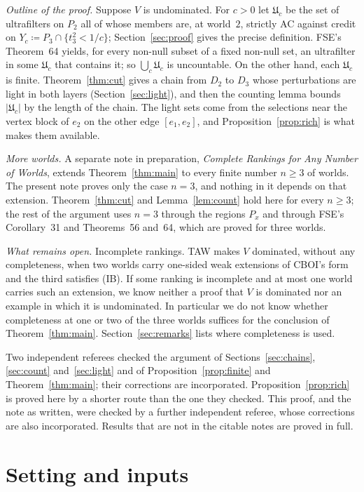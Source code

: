 \documentclass[11pt]{article}
\theoremstyle{definition}\newtheorem{definition}[theorem]{Definition}
\theoremstyle{remark}\newtheorem{remark}[theorem]{Remark}
\newcommand{\UU}{\mathfrak U}
\begin{document}
\emph{Outline of the proof.} Suppose $V$ is undominated. For $c>0$ let
$\UU_c$ be the set of ultrafilters on $P_2$ all of whose members are, at
world~$2$, strictly AC against credit on $Y_c\coloneqq P_3\cap
\{t^2_3<1/c\}$; Section~\ref{sec:proof} gives the precise definition.
FSE's Theorem~64 yields, for every non-null subset of a fixed non-null set,
an ultrafilter in some $\UU_c$ that contains it; so $\bigcup_c\UU_c$ is
uncountable. On the other hand, each $\UU_c$ is finite.
Theorem~\ref{thm:cut} gives a chain from $D_2$ to $D_3$ whose perturbations
are light in both layers (Section~\ref{sec:light}), and then the counting
lemma bounds $|\UU_c|$ by the length of the chain. The light sets come from
the selections near the vertex block of $e_2$ on the other edge
$[e_1,e_2]$, and Proposition~\ref{prop:rich} is what makes them available.

\emph{More worlds.} A separate note in preparation, \emph{Complete
Rankings for Any Number of Worlds}, extends Theorem~\ref{thm:main} to every
finite number $n\ge3$ of worlds. The present note proves only the case
$n=3$, and nothing in it depends on that extension.
Theorem~\ref{thm:cut} and Lemma~\ref{lem:count} hold here for every $n\ge3$;
the rest of the argument uses $n=3$ through the regions $P_x$ and through
FSE's Corollary~31 and Theorems~56 and~64, which are proved for three
worlds.

\emph{What remains open.} Incomplete rankings. TAW makes $V$ dominated,
without any completeness, when two worlds carry one-sided weak extensions of
CBOI's form and the third satisfies (IB). If some ranking is incomplete and
at most one world carries such an extension, we know neither a proof that
$V$ is dominated nor an example in which it is undominated. In particular we
do not know whether completeness at one or two of the three worlds suffices
for the conclusion of Theorem~\ref{thm:main}. Section~\ref{sec:remarks}
lists where completeness is used.

Two independent referees checked the argument of
Sections~\ref{sec:chains}, \ref{sec:count} and~\ref{sec:light} and of
Proposition~\ref{prop:finite} and Theorem~\ref{thm:main}; their corrections
are incorporated. Proposition~\ref{prop:rich} is proved here by a shorter
route than the one they checked. This proof, and the note as written, were
checked by a further independent referee, whose corrections are also
incorporated. Results that are not in the citable notes are proved in full.

\section{Setting and inputs}\label{sec:setting}
\end{document}
